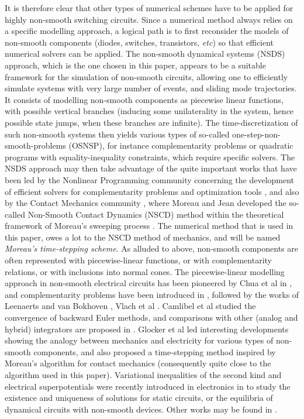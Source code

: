 It is therefore clear that other types of numerical schemes have to be applied for highly non-smooth switching circuits. Since a numerical method always relies on a specific modelling approach, a logical path is to first reconsider the models of non-smooth components (diodes, switches, transistors, {\em etc}) so that efficient numerical solvers can be applied. The non-smooth dynamical systems (NSDS) approach, which is the one chosen in this paper, appears to be a suitable framework for the simulation of non-smooth circuits, allowing one to efficiently simulate systems with very large number of events, and sliding mode trajectories. It consists of modelling non-smooth components as piecewise linear functions, with possible vertical branches (inducing some unilaterality in the system, hence possible state jumps, when these branches are infinite). The time-discretization of such non-smooth systems then yields various types of so-called one-step-non-smooth-problems (OSNSP), for instance complementarity problems or quadratic programs with equality-inequality constraints, which require specific solvers. The NSDS approach may then take advantage of the quite important works that have been led by the Nonlinear Programming community concerning the development of efficient solvers for complementarity problems \cite{facchinei} and optimization tools \cite{hiriart1992}, and also by the Contact Mechanics community \cite{acary-brogliato2008}, where Moreau and Jean developed the so-called Non-Smooth Contact Dynamics (NSCD) method within the theoretical framework of Moreau's sweeping process \cite{moreau1988,jean1999,moreau1999}. The numerical method that is used in this paper, owes a lot to the NSCD method of mechanics, and will be named {\em Moreau's time-stepping scheme}. As alluded to above, non-smooth components are often represented with piecewise-linear functions, or with complementarity relations, or with inclusions into normal cones. The piecewise-linear modelling approach in non-smooth electrical circuits has been pioneered by Chua et al  in \cite{chua1978,chua1983,chua1985}, and complementarity problems have been introduced in \cite{bokhoven1978,stevens1981,vandenberghe1989}, followed by the works of Leenaerts and van Bokhoven \cite{leenaerts1999,leenaerts-bokhoven1998}, Vlach et al \cite{bedrosian1992,vlach1997,vlach1995a,vlach1995b}. Camlibel et al \cite{frasca2008,camlibel2002} studied the convergence of backward Euler methods, and comparisons with other (analog and hybrid) integrators are proposed in \cite{vasca2009}. Glocker et al \cite{glocker2005,moller2007} led interesting developments showing the analogy between mechanics and electricity for various types of non-smooth components, and also proposed a time-stepping method inspired by Moreau's algorithm for contact mechanics (consequently quite close to the algorithm used in this paper). Variational inequalities of the second kind and electrical superpotentials  were recently introduced in electronics in \cite{adly2007,goelevenJOTA,addi2009} to study the existence and uniqueness of solutions for static circuits, or the equilibria of dynamical circuits with non-smooth devices. Other works may be found in \cite{enge2005,batlle2005,giaouris2008}.


